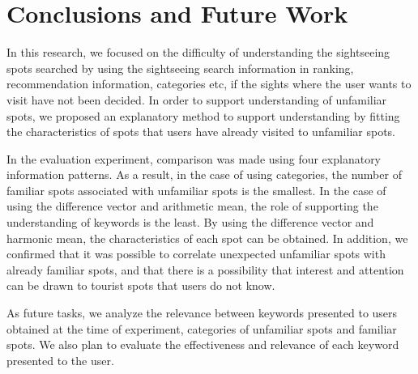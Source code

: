 \documentclass[journal]{IAENGtran}
\begin{document}
\section{Conclusions and Future Work}
\label{sec:Conclusions and Future Work}
In this research, we focused on the difficulty of understanding the sightseeing spots searched by using the sightseeing search information in ranking, recommendation information, categories etc, if the sights where the user wants to visit have not been decided.
In order to support understanding of unfamiliar spots, we proposed an explanatory method to support understanding by fitting the characteristics of spots that users have already visited to unfamiliar spots.

In the evaluation experiment, comparison was made using four explanatory information patterns.
As a result, in the case of using categories, the number of familiar spots associated with unfamiliar spots is the smallest.
In the case of using the difference vector and arithmetic mean, the role of supporting the understanding of keywords is the least.
By using the difference vector and harmonic mean, the characteristics of each spot can be obtained.
In addition, we confirmed that it was possible to correlate unexpected unfamiliar spots with already familiar spots, and that there is a possibility that interest and attention can be drawn to tourist spots that users do not know.

As future tasks, we analyze the relevance between keywords presented to users obtained at the time of experiment, categories of unfamiliar spots and familiar spots.
We also plan to evaluate the effectiveness and relevance of each keyword presented to the user.
\end{document}
